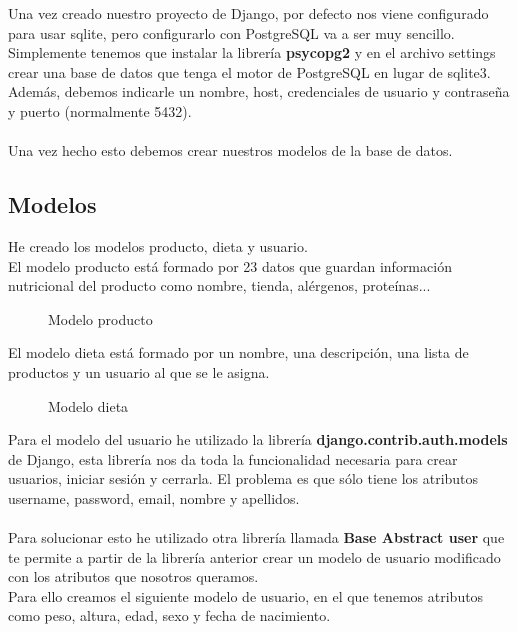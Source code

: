 Una vez creado nuestro proyecto de Django, por defecto nos viene configurado para usar sqlite, pero configurarlo con PostgreSQL va a ser muy sencillo.
Simplemente tenemos que instalar la librería \textbf{psycopg2} y en el archivo settings crear una base de datos que tenga el motor de PostgreSQL en lugar de sqlite3.
Además, debemos indicarle un nombre, host, credenciales de usuario y contraseña y puerto (normalmente 5432).\\ \\

Una vez hecho esto debemos crear nuestros modelos de la base de datos.

\subsection{Modelos}

He creado los modelos producto, dieta y usuario.\\
El modelo producto está formado por 23 datos que guardan información nutricional del producto como nombre, tienda, alérgenos, proteínas...

\begin{figure}[H]
  \centering
  \noindent{}
  \caption{Modelo producto}
\end{figure}

El modelo dieta está formado por un nombre, una descripción, una lista de productos y un usuario al que se le asigna.

\begin{figure}[H]
  \centering
  \noindent{}
  \caption{Modelo dieta}
\end{figure}

Para el modelo del usuario he utilizado la librería \textbf{django.contrib.auth.models} de Django, 
esta librería nos da toda la funcionalidad necesaria para crear usuarios, iniciar sesión y cerrarla. 
El problema es que sólo tiene los atributos username, password, email, nombre y apellidos.\\\\

Para solucionar esto he utilizado otra librería llamada \textbf{Base Abstract user} que te permite a partir 
de la librería anterior crear un modelo de usuario modificado con los atributos que nosotros queramos.\\

Para ello creamos el siguiente modelo de usuario, en el que tenemos atributos como peso, altura, edad, sexo y fecha de nacimiento.

